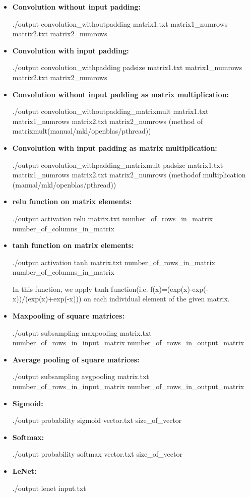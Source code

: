 \documentclass{article}
\begin{document}
\begin{itemize}
\tightlist
\item \textbf{Convolution without input padding:}

./output convolution\_withoutpadding
matrix1.txt matrix1\_numrows matrix2.txt matrix2\_numrows

\item \textbf{Convolution with input padding:}

./output convolution\_withpadding padsize
matrix1.txt matrix1\_numrows matrix2.txt matrix2\_numrows


\item \textbf{Convolution without input padding as matrix multiplication:}

./output
convolution\_withoutpadding\_matrixmult matrix1.txt matrix1\_numrows
matrix2.txt matrix2\_numrows
(method of matrixmult(manual/mkl/openblas/pthread))

\item \textbf{Convolution with input padding as matrix multiplication:}

./output convolution\_withpadding\_matrixmult
padsize matrix1.txt matrix1\_numrows matrix2.txt matrix2\_numrows
 (methodof multiplication (manual/mkl/openblas/pthread))

\item \textbf{relu function on matrix elements:}

./output activation relu matrix.txt
number\_of\_rows\_in\_matrix number\_of\_columns\_in\_matrix

\item \textbf{tanh function on matrix elements:}

./output activation tanh matrix.txt
number\_of\_rows\_in\_matrix number\_of\_columns\_in\_matrix

In this function, we apply tanh function(i.e.
f(x)=(exp(x)-exp(-x))/(exp(x)+exp(-x))) on each individual element of
the given matrix.

\item \textbf{Maxpooling of square matrices:}

./output subsampling maxpooling matrix.txt
number\_of\_rows\_in\_input\_matrix
number\_of\_rows\_in\_output\_matrix


\item \textbf{Average pooling of square matrices:}

./output subsampling avgpooling matrix.txt
number\_of\_rows\_in\_input\_matrix
number\_of\_rows\_in\_output\_matrix

\item \textbf{Sigmoid:}

./output probability sigmoid vector.txt
size\_of\_vector

\item \textbf{Softmax:}

./output probability softmax vector.txt
size\_of\_vector

\item \textbf{LeNet:}

./output lenet input.txt

\end{itemize}
\end{document}
